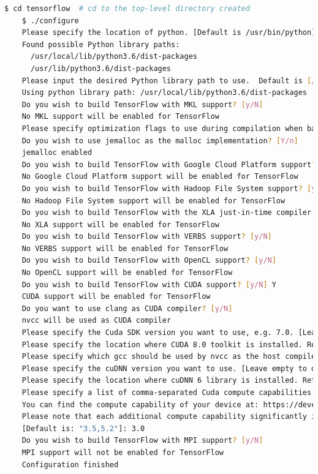 \newpage
{}


\begin{lstlisting}[caption=Configure bazel for Tensorflow, label=list:configure_bazel, language=bash]
	$ cd tensorflow  # cd to the top-level directory created
	$ ./configure
	Please specify the location of python. [Default is /usr/bin/python]: /usr/bin/python3.6
	Found possible Python library paths:
	  /usr/local/lib/python3.6/dist-packages
	  /usr/lib/python3.6/dist-packages
	Please input the desired Python library path to use.  Default is [/usr/lib/python3.6/dist-packages]
	Using python library path: /usr/local/lib/python3.6/dist-packages
	Do you wish to build TensorFlow with MKL support? [y/N]
	No MKL support will be enabled for TensorFlow
	Please specify optimization flags to use during compilation when bazel option "--config=opt" is specified [Default is -march=native]:
	Do you wish to use jemalloc as the malloc implementation? [Y/n]
	jemalloc enabled
	Do you wish to build TensorFlow with Google Cloud Platform support? [y/N]
	No Google Cloud Platform support will be enabled for TensorFlow
	Do you wish to build TensorFlow with Hadoop File System support? [y/N]
	No Hadoop File System support will be enabled for TensorFlow
	Do you wish to build TensorFlow with the XLA just-in-time compiler (experimental)? [y/N]
	No XLA support will be enabled for TensorFlow
	Do you wish to build TensorFlow with VERBS support? [y/N]
	No VERBS support will be enabled for TensorFlow
	Do you wish to build TensorFlow with OpenCL support? [y/N]
	No OpenCL support will be enabled for TensorFlow
	Do you wish to build TensorFlow with CUDA support? [y/N] Y
	CUDA support will be enabled for TensorFlow
	Do you want to use clang as CUDA compiler? [y/N]
	nvcc will be used as CUDA compiler
	Please specify the Cuda SDK version you want to use, e.g. 7.0. [Leave empty to default to CUDA 8.0]: 8.0
	Please specify the location where CUDA 8.0 toolkit is installed. Refer to README.md for more details. [Default is /usr/local/cuda]:
	Please specify which gcc should be used by nvcc as the host compiler. [Default is /usr/bin/gcc]:
	Please specify the cuDNN version you want to use. [Leave empty to default to cuDNN 6.0]: 6
	Please specify the location where cuDNN 6 library is installed. Refer to README.md for more details. [Default is /usr/local/cuda]:
	Please specify a list of comma-separated Cuda compute capabilities you want to build with.
	You can find the compute capability of your device at: https://developer.nvidia.com/cuda-gpus.
	Please note that each additional compute capability significantly increases your build time and binary size.
	[Default is: "3.5,5.2"]: 3.0
	Do you wish to build TensorFlow with MPI support? [y/N]
	MPI support will not be enabled for TensorFlow
	Configuration finished
\end{lstlisting}

